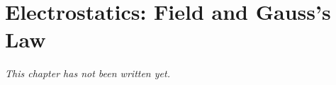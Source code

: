 \chapter{Electrostatics: Field and Gauss's Law}\label{ch:b1:electrostatics-gauss}


\emph{This chapter has not been written yet.}
